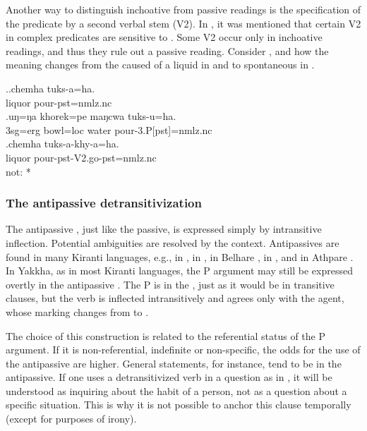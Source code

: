 Another way to distinguish inchoative from passive readings is the spe\-ci\-fi\-cation of the predicate by a second verbal stem (V2). In , it was mentioned that certain V2 in complex predicates are sensitive to . Some V2 occur only in inchoative readings, and thus they rule out a  passive reading. Consider \Next, and how the meaning changes from the caused  of a liquid in \Next[a] and \Next[b] to spontaneous  in \Next[c].
\largerpage

\ex.\ag.chemha tuks-a=ha.\\
liquor pour{\sc [3sg]-pst=nmlz.nc} \\
\bg.uŋ=ŋa khorek=pe maŋcwa tuks-u=ha.\\
{\sc 3sg=erg} bowl{\sc =loc} water pour{\sc -3.P[pst]=nmlz.nc}\\
\bg.chemha tuks-a-khy-a=ha.\\
liquor pour{\sc [3sg]-pst-V2.go-pst=nmlz.nc} \\
 not: *


\subsubsection{The antipassive detransitivization}\label{detr-antip}

The antipassive , just like the passive, is expressed simply by intransitive inflection. Potential ambiguities are  resolved by the context. Antipassives are  found in many Kiranti languages, e.g., in , in , in Belhare \citep{Bickel2011Detrans, Schikowski2013_Thesis}, in  \citep[221]{Doornenbal2009A-grammar}, and in Athpare \citep[122]{Ebert1997A-grammar}. In Yakkha, as in most Kiranti languages, the P argument may still be expressed overtly in the antipassive . The P is in the , just as it would be in transitive clauses, but the verb is inflected intransitively and agrees only with the agent, whose  marking changes from  to .

The choice of this construction is related to the referential status of the P argument. If it is non-referential, indefinite or non-specific, the odds for the use of the antipassive are higher. General statements, for instance,  tend to be in the antipassive. If one uses a detransitivized verb in a question as in \Next, it will be understood as inquiring about the habit of a person, not as a question about a specific situation. This is why it is not possible to anchor this clause temporally (except for purposes of irony). 


